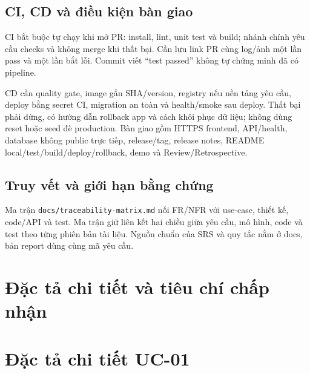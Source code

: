 \subsection{CI, CD và điều kiện bàn giao}
CI bắt buộc tự chạy khi mở PR: install, lint, unit test và build; nhánh chính yêu cầu checks và không merge khi thất bại. Cần lưu link PR cùng log/ảnh một lần pass và một lần bắt lỗi. Commit viết ``test passed'' không tự chứng minh đã có pipeline.

CD cần quality gate, image gắn SHA/version, registry nếu nền tảng yêu cầu, deploy bằng secret CI, migration an toàn và health/smoke sau deploy. Thất bại phải dừng, có hướng dẫn rollback app và cách khôi phục dữ liệu; không dùng reset hoặc seed đè production. Bàn giao gồm HTTPS frontend, API/health, database không public trực tiếp, release/tag, release notes, README local/test/build/deploy/rollback, demo và Review/Retrospective.

\subsection{Truy vết và giới hạn bằng chứng}
Ma trận \texttt{docs/traceability-matrix.md} nối FR/NFR với use-case, thiết kế, code/API và test. Ma trận giữ liên kết hai chiều giữa yêu cầu, mô hình, code và test theo từng phiên bản tài liệu. Nguồn chuẩn của SRS và quy tắc nằm ở docs, bản report dùng cùng mã yêu cầu.

\section{Đặc tả chi tiết và tiêu chí chấp nhận}

\section{Đặc tả chi tiết UC-01}

